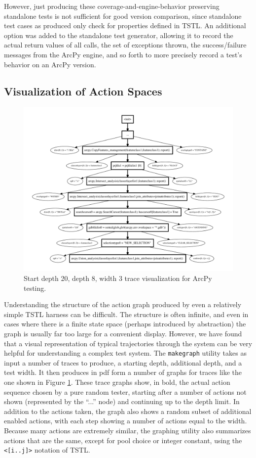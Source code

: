 However, just producing these coverage-and-engine-behavior preserving
standalone tests is not sufficient for good version comparison, since
standalone test cases as produced only check for properties defined in TSTL.  An
additional option was added to the standalone test generator, allowing
it to record the actual return values of all calls, the set of
exceptions thrown, the success/failure messages from the ArcPy engine, and so forth to more precisely record a test's
behavior on an ArcPy version.


\subsection{Visualization of Action Spaces}

\begin{figure}
\includegraphics[width=\columnwidth]{shortgraph}
\caption{Start depth 20, depth 8, width 3 trace visualization for ArcPy testing.}
\label{fig:actions}
\end{figure}

Understanding the structure of the action graph produced by even a relatively simple TSTL harness can be difficult.  The structure is often infinite, and even in cases where there is a finite state space (perhaps introduced by abstraction) the graph is usually far too large for a convenient display.  However, we have found that a visual representation of typical trajectories through the system can be very helpful for understanding a complex test system.  The {\tt makegraph} utility takes as input a number of traces to produce, a starting depth, additional depth, and a test width.  It then produces in pdf form a number of graphs for traces like the one shown in Figure \ref{fig:actions}.  These trace graphs show, in bold, the actual action sequence chosen by a pure random tester, starting after a number of actions not shown (represented by the ``...'' node) and continuing up to the depth limit.  In addition to the actions taken, the graph also shows a random subset of additional enabled actions, with each step showing a number of actions equal to the width.  Because many actions are extremely similar, the graphing utility also summarizes actions that are the same, except for pool choice or integer constant, using the {\tt <[i..j]>} notation of TSTL.

